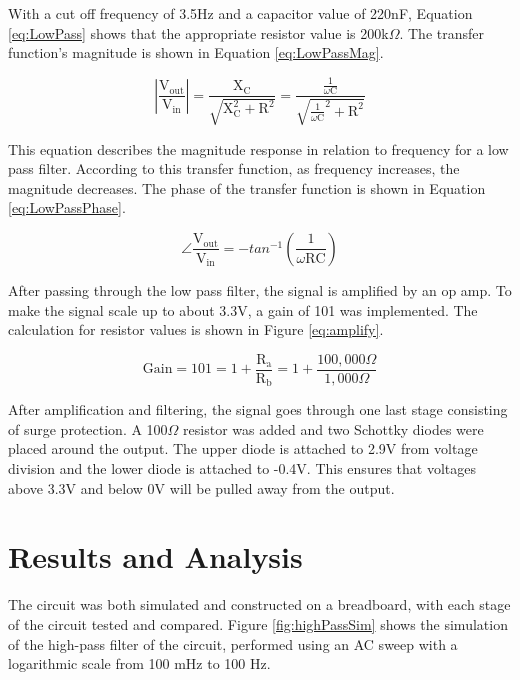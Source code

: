 \documentclass[CMPE]{KGCOEReport}
\begin{document}
With a cut off frequency of 3.5Hz and a capacitor value of 220nF, Equation \ref{eq:LowPass} shows that the appropriate resistor value is 200k$\Omega$. The transfer function's magnitude is shown in Equation \ref{eq:LowPassMag}.

\begin{equation}
|\frac{\text{V}_\text{out}}{\text{V}_\text{in}}| = \frac{\text{X}_\text{C}}{\sqrt{\text{X}_\text{C}^2 + \text{R}^2}} = \frac{\frac{1}{\omega\text{C}}}{\sqrt{\frac{1}{\omega\text{C}}^2 + \text{R}^2}} \label{eq:LowPassMag}
\end{equation}

This equation describes the magnitude response in relation to frequency for a low pass filter. According to this transfer function, as frequency increases, the magnitude decreases. The phase of the transfer function is shown in Equation \ref{eq:LowPassPhase}. 

\begin{equation}
\angle\frac{\text{V}_\text{out}}{\text{V}_\text{in}} = -tan^{-1}(\frac{1}{\omega\text{R}\text{C}}) \label{eq:LowPassPhase}
\end{equation}

After passing through the low pass filter, the signal is amplified by an op amp. To make the signal scale up to about 3.3V, a gain of 101 was implemented. The calculation for resistor values is shown in Figure \ref{eq:amplify}. 

\begin{equation}
\text{Gain} = 101 = 1 + \frac{\text{R}_\text{a}}{\text{R}_\text{b}} = 1 + \frac{100,000\Omega}{1,000\Omega} \label{eq:amplify}
\end{equation}

After amplification and filtering, the signal goes through one last stage consisting of surge protection. A 100$\Omega$ resistor was added and two Schottky diodes were placed around the output. The upper diode is attached to 2.9V from voltage division and the lower diode is attached to -0.4V. This ensures that voltages above 3.3V and below 0V will be pulled away from the output. 

\section*{Results and Analysis}

The circuit was both simulated and constructed on a breadboard, with each stage of the circuit tested and compared. Figure \ref{fig:highPassSim} shows the simulation of the high-pass filter of the circuit, performed using an AC sweep with a logarithmic scale from 100 mHz to 100 Hz.
\end{document}
